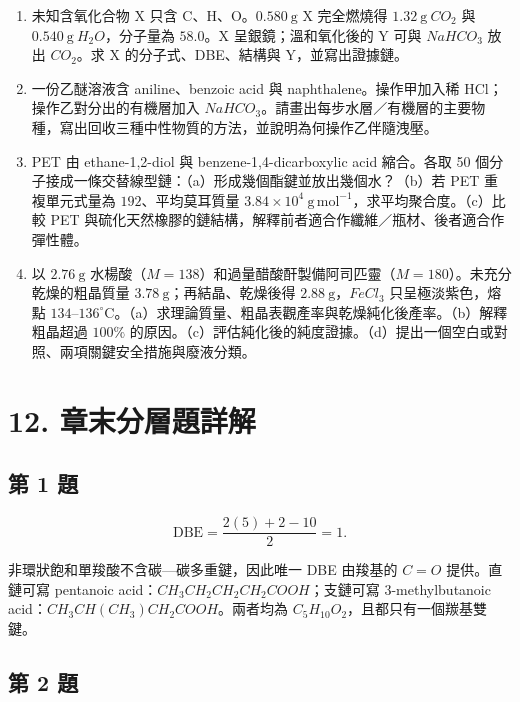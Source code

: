 \documentclass[11pt,a4paper]{article}
\providecommand{\tightlist}{%
  \setlength{\itemsep}{0pt}\setlength{\parskip}{0pt}}
\begin{document}
\begin{enumerate}
\def\labelenumi{\arabic{enumi}.}
\setcounter{enumi}{12}
\tightlist
\item
  未知含氧化合物 X 只含 C、H、O。\(0.580\ \mathrm g\) X 完全燃燒得 \(1.32\ \mathrm g\ CO_2\) 與 \(0.540\ \mathrm g\ H_2O\)，分子量為 \(58.0\)。X 呈銀鏡；溫和氧化後的 Y 可與 \(NaHCO_3\) 放出 \(CO_2\)。求 X 的分子式、DBE、結構與 Y，並寫出證據鏈。
\item
  一份乙醚溶液含 aniline、benzoic acid 與 naphthalene。操作甲加入稀 HCl；操作乙對分出的有機層加入 \(NaHCO_3\)。請畫出每步水層／有機層的主要物種，寫出回收三種中性物質的方法，並說明為何操作乙伴隨洩壓。
\item
  PET 由 ethane-1,2-diol 與 benzene-1,4-dicarboxylic acid 縮合。各取 50 個分子接成一條交替線型鏈：（a）形成幾個酯鍵並放出幾個水？（b）若 PET 重複單元式量為 \(192\)、平均莫耳質量 \(3.84\times10^4\ \mathrm{g\,mol^{-1}}\)，求平均聚合度。（c）比較 PET 與硫化天然橡膠的鏈結構，解釋前者適合作纖維／瓶材、後者適合作彈性體。
\item
  以 \(2.76\ \mathrm g\) 水楊酸（\(M=138\)）和過量醋酸酐製備阿司匹靈（\(M=180\)）。未充分乾燥的粗晶質量 \(3.78\ \mathrm g\)；再結晶、乾燥後得 \(2.88\ \mathrm g\)，\(FeCl_3\) 只呈極淡紫色，熔點 \(134\)--\(136^\circ\mathrm C\)。（a）求理論質量、粗晶表觀產率與乾燥純化後產率。（b）解釋粗晶超過 \(100\%\) 的原因。（c）評估純化後的純度證據。（d）提出一個空白或對照、兩項關鍵安全措施與廢液分類。
\end{enumerate}

\section{12. 章末分層題詳解}\label{ux7ae0ux672bux5206ux5c64ux984cux8a73ux89e3}

\subsection{第 1 題}\label{ux7b2c-1-ux984c}

\[
\mathrm{DBE}=\frac{2(5)+2-10}{2}=1.
\]

非環狀飽和單羧酸不含碳---碳多重鍵，因此唯一 DBE 由羧基的 \(C=O\) 提供。直鏈可寫 pentanoic acid：\(CH_3CH_2CH_2CH_2COOH\)；支鏈可寫 3-methylbutanoic acid：\(CH_3CH(CH_3)CH_2COOH\)。兩者均為 \(C_5H_{10}O_2\)，且都只有一個羰基雙鍵。

\subsection{第 2 題}\label{ux7b2c-2-ux984c}
\end{document}

